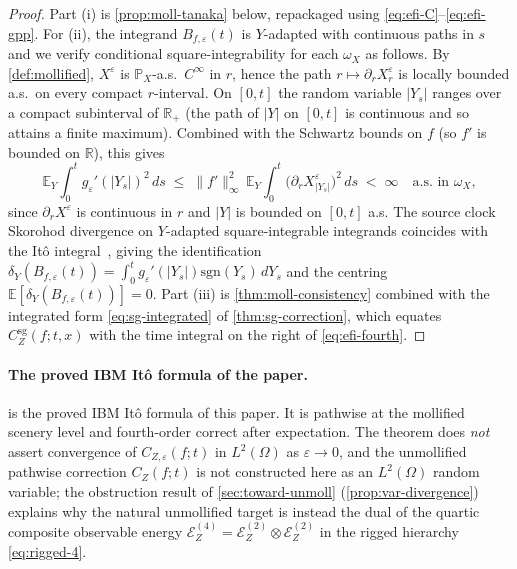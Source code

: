 \documentclass[11pt,reqno]{amsart}
\theoremstyle{plain}
\theoremstyle{definition}
\theoremstyle{remark}
\newcommand{\R}{\mathbb{R}}
\newcommand{\E}{\mathbb{E}}
\newcommand{\Prob}{\mathbb{P}}
\newcommand{\Energy}{\mathcal{E}}
\newcommand{\IBM}{Z}
\begin{document}
\begin{proof}
Part (i) is \cref{prop:moll-tanaka} below, repackaged using
\eqref{eq:efi-C}--\eqref{eq:efi-gpp}. For (ii), the integrand
$B_{f,\varepsilon}(t)$ is $Y$-adapted with continuous paths in $s$
and we verify conditional square-integrability for each $\omega_X$
as follows. By \cref{def:mollified}, $X^\varepsilon$ is
$\Prob_X$-a.s.\ $C^{\infty}$ in $r$, hence the path
$r\mapsto\partial_r X^\varepsilon_r$ is locally bounded a.s.\ on
every compact $r$-interval. On $[0,t]$ the random variable
$|Y_s|$ ranges over a compact subinterval of $\R_{+}$ (the path of
$|Y|$ on $[0,t]$ is continuous and so attains a finite maximum).
Combined with the Schwartz bounds on $f$ (so $f'$ is bounded on
$\R$), this gives
\[
  \E_Y\!\int_0^{t}g_\varepsilon'(|Y_s|)^{2}\,ds
   \;\le\;\|f'\|_\infty^{2}\,
    \E_Y\!\int_0^{t}\bigl(\partial_r X^\varepsilon_{|Y_s|}\bigr)^{2}\,ds
   \;<\;\infty\quad\text{a.s.\ in }\omega_X,
\]
since $\partial_r X^\varepsilon$ is continuous in $r$ and $|Y|$ is
bounded on $[0,t]$ a.s. The source clock Skorohod divergence on
$Y$-adapted square-integrable integrands coincides with the It\^o
integral~\cite{Nualart}, giving the identification
$\delta_Y(B_{f,\varepsilon}(t))=\int_0^t g_\varepsilon'(|Y_s|)
\mathrm{sgn}(Y_s)\,dY_s$ and the centring
$\E[\delta_Y(B_{f,\varepsilon}(t))]=0$. Part (iii) is
\cref{thm:moll-consistency} combined with the integrated form
\eqref{eq:sg-integrated} of \cref{thm:sg-correction}, which equates
$C_\IBM^{\mathrm{sg}}(f;t,x)$ with the time integral on the right of
\eqref{eq:efi-fourth}.
\end{proof}

\paragraph{The proved IBM It\^o formula of the paper.}
 is the proved IBM It\^o formula of
this paper. It is pathwise at the mollified scenery level and
fourth-order correct after expectation. The theorem does \emph{not}
assert convergence of $C_{\IBM,\varepsilon}(f;t)$ in
$L^{2}(\Omega)$ as $\varepsilon\to 0$, and the unmollified pathwise
correction $C_\IBM(f;t)$ is not constructed here as an
$L^{2}(\Omega)$ random variable; the obstruction result of
\cref{sec:toward-unmoll} (\cref{prop:var-divergence}) explains why
the natural unmollified target is instead the dual of the quartic
composite observable energy
$\Energy_\IBM^{(4)}=\Energy_\IBM^{(2)}\otimes\Energy_\IBM^{(2)}$ in
the rigged hierarchy \eqref{eq:rigged-4}.
\end{document}
